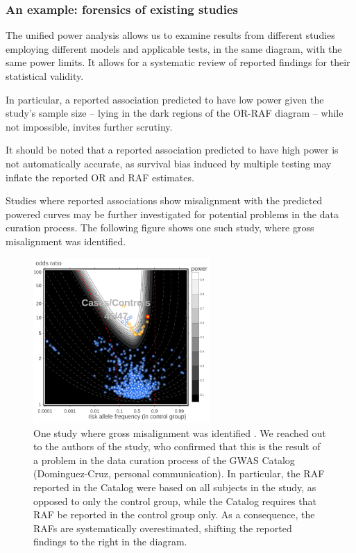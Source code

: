 \subsubsection{An example: forensics of existing studies}

The unified power analysis allows us to examine results from different studies employing different models and applicable tests, in the same diagram, with the same power limits.
It allows for a systematic review of reported findings for their statistical validity.

In particular, a reported association predicted to have low power given the study's sample size -- lying in the dark regions of the OR-RAF diagram -- while not impossible, invites further scrutiny. 

It should be noted that a reported association predicted to have high power is not automatically accurate, as survival bias induced by multiple testing may inflate the reported OR and RAF estimates.

Studies where reported associations show misalignment with the predicted powered curves may be further investigated for potential problems in the data curation process.
The following figure shows one such study, where gross misalignment was identified.

\begin{figure}[!tpb]
    \centering
    \includegraphics[width=0.6\textwidth]{forensics.png}
    \caption{
    One study where gross misalignment was identified \citep{Dominguez-Cruz18}. 
    We reached out to the authors of the study, who confirmed that this is the result of a problem in the data curation process of the GWAS Catalog (Dominguez-Cruz, personal communication). 
    In particular, the RAF reported in the Catalog were based on all subjects in the study, as opposed to only the control group, while the Catalog requires that RAF be reported in the control group only. 
    As a consequence, the RAFs are systematically overestimated, shifting the reported findings to the right in the diagram.
    }
    \label{fig:forensics}
\end{figure}

